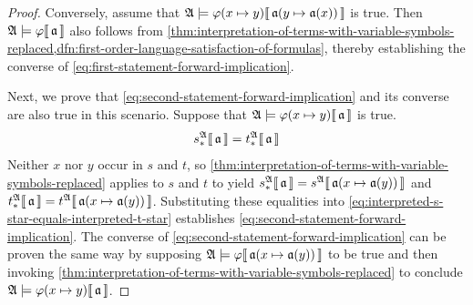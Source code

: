 \begin{proof}
    \vspace{0.3cm}
    \noindent
    Conversely, assume that
    \( \folwffsatisfaction{\mathfrak{A}}{ \folfreevariablereplacement{\varphi}{x}{y} }{ \folmodifiedvariableassignmentfunction{\mathfrak{a}}{y}{\mathfrak{a}(x)} }\) is true.
    Then \(  \mathfrak{A} \models \varphi\llbracket\, \mathfrak{a} \,\rrbracket \) also follows from
    \cref{thm:interpretation-of-terms-with-variable-symbols-replaced,dfn:first-order-language-satisfaction-of-formulas}, thereby
    establishing the converse of \eqref{eq:first-statement-forward-implication}.

    \vspace{0.3cm}
    \noindent
    Next, we prove that \eqref{eq:second-statement-forward-implication} and its converse are also true in this scenario.
    Suppose that \( \folwffsatisfaction{\mathfrak{A}}{ \folfreevariablereplacement{\varphi}{x}{y} }{\mathfrak{a}} \) is true.
    \begin{equation}
        \label{eq:interpreted-s-star-equals-interpreted-t-star}
        s_{\ast}^{\mathfrak{A}}\llbracket\, \mathfrak{a} \,\rrbracket = t_{\ast}^{\mathfrak{A}}\llbracket\, \mathfrak{a} \,\rrbracket
    \end{equation}
    Neither \( x \) nor \( y \) occur in \( s \) and \( t \), so
    \cref{thm:interpretation-of-terms-with-variable-symbols-replaced} applies to \( s \) and \( t \) to yield
    \( \folterminterpretation{s_{\ast}}{\mathfrak{A}}{\mathfrak{a}} = \folterminterpretation{s}{\mathfrak{A}}{ \folmodifiedvariableassignmentfunction{\mathfrak{a}}{x}{\mathfrak{a}(y)} } \) and  \( \folterminterpretation{t_{\ast}}{\mathfrak{A}}{\mathfrak{a}} = \folterminterpretation{t}{\mathfrak{A}}{ \folmodifiedvariableassignmentfunction{\mathfrak{a}}{x}{\mathfrak{a}(y)} } \). Substituting these equalities into \eqref{eq:interpreted-s-star-equals-interpreted-t-star} establishes \eqref{eq:second-statement-forward-implication}.
    The converse of \eqref{eq:second-statement-forward-implication} can be proven the same way by supposing
    \( \folwffsatisfaction{\mathfrak{A}}{\varphi}{ \folmodifiedvariableassignmentfunction{\mathfrak{a}}{x}{\mathfrak{a}(y)} } \) to be true
    and then invoking \cref{thm:interpretation-of-terms-with-variable-symbols-replaced} to conclude
    \( \folwffsatisfaction{\mathfrak{A}}{ \folfreevariablereplacement{\varphi}{x}{y} }{\mathfrak{a}} \).


\end{proof}
